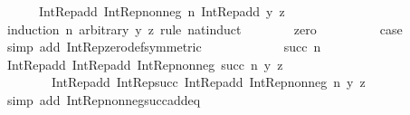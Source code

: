 \begin{isabellebody}
\ \ \ \ \ \ Int{\isacharunderscore}{\kern0pt}Rep{\isacharunderscore}{\kern0pt}add\ {\isacharparenleft}{\kern0pt}Int{\isacharunderscore}{\kern0pt}Rep{\isacharunderscore}{\kern0pt}nonneg\ n{\isacharparenright}{\kern0pt}\ {\isacharparenleft}{\kern0pt}Int{\isacharunderscore}{\kern0pt}Rep{\isacharunderscore}{\kern0pt}add\ y\ z{\isacharparenright}{\kern0pt}{\isachardoublequoteclose}\isanewline
\ \ \ \ \isamarkupfalse%
\ {\isacharparenleft}{\kern0pt}induction\ n\ arbitrary{\isacharcolon}{\kern0pt}\ y\ z\ rule{\isacharcolon}{\kern0pt}\ nat{\isacharunderscore}{\kern0pt}induct{\isacharparenright}{\kern0pt}\isanewline
\ \ \ \ \ \ \isamarkupfalse%
\ zero\isanewline
\ \ \ \ \ \ \isamarkupfalse%
\ \isamarkupfalse%
\ {\isacharquery}{\kern0pt}case\ \isamarkupfalse%
\ {\isacharparenleft}{\kern0pt}simp\ add{\isacharcolon}{\kern0pt}\ Int{\isacharunderscore}{\kern0pt}Rep{\isacharunderscore}{\kern0pt}zero{\isacharunderscore}{\kern0pt}def{\isacharbrackleft}{\kern0pt}symmetric{\isacharbrackright}{\kern0pt}{\isacharparenright}{\kern0pt}\isanewline
\ \ \ \ \isamarkupfalse%
\isanewline
\ \ \ \ \ \ \isamarkupfalse%
\ {\isacharparenleft}{\kern0pt}succ\ n{\isacharparenright}{\kern0pt}\isanewline
\ \ \ \ \ \ \isamarkupfalse%
\ \isamarkupfalse%
\ {\isachardoublequoteopen}Int{\isacharunderscore}{\kern0pt}Rep{\isacharunderscore}{\kern0pt}add\ {\isacharparenleft}{\kern0pt}Int{\isacharunderscore}{\kern0pt}Rep{\isacharunderscore}{\kern0pt}add\ {\isacharparenleft}{\kern0pt}Int{\isacharunderscore}{\kern0pt}Rep{\isacharunderscore}{\kern0pt}nonneg\ {\isacharparenleft}{\kern0pt}succ\ n{\isacharparenright}{\kern0pt}{\isacharparenright}{\kern0pt}\ y{\isacharparenright}{\kern0pt}\ z\ {\isacharequal}{\kern0pt}\isanewline
\ \ \ \ \ \ \ \ Int{\isacharunderscore}{\kern0pt}Rep{\isacharunderscore}{\kern0pt}add\ {\isacharparenleft}{\kern0pt}Int{\isacharunderscore}{\kern0pt}Rep{\isacharunderscore}{\kern0pt}succ\ {\isacharparenleft}{\kern0pt}Int{\isacharunderscore}{\kern0pt}Rep{\isacharunderscore}{\kern0pt}add\ {\isacharparenleft}{\kern0pt}Int{\isacharunderscore}{\kern0pt}Rep{\isacharunderscore}{\kern0pt}nonneg\ n{\isacharparenright}{\kern0pt}\ y{\isacharparenright}{\kern0pt}{\isacharparenright}{\kern0pt}\ z{\isachardoublequoteclose}\isanewline
\ \ \ \ \ \ \ \ \isamarkupfalse%
\ {\isacharparenleft}{\kern0pt}simp\ add{\isacharcolon}{\kern0pt}\ Int{\isacharunderscore}{\kern0pt}Rep{\isacharunderscore}{\kern0pt}nonneg{\isacharunderscore}{\kern0pt}succ{\isacharunderscore}{\kern0pt}add{\isacharunderscore}{\kern0pt}eq{\isacharparenright}{\kern0pt}\isanewline

\end{isabellebody}
